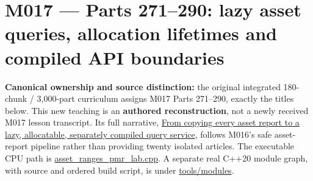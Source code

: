 \section{M017 --- Parts 271--290: lazy asset queries, allocation lifetimes and compiled API boundaries}\label{appendix-fd090d982a15-m017-parts-271290-lazy-asset-queries-allocation-lifetimes-and-compiled-api-boundaries}

\textbf{Canonical ownership and source distinction:} the original integrated 180-chunk / 3,000-part curriculum assigns M017 Parts 271--290, exactly the titles below. This new teaching is an \textbf{authored reconstruction}, not a newly received M017 lesson transcript. Its full narrative, \href{Continuous\%20Notes/Computing\%20Foundations\%20-\%20From\%20Bits\%20to\%20C++\%20and\%20Systems\%20APIs\#From\%20copying\%20every\%20asset\%20report\%20to\%20a\%20lazy,\%20allocatable,\%20separately\%20compiled\%20query\%20service}{From copying every asset report to a lazy, allocatable, separately compiled query service}, follows M016's safe asset-report pipeline rather than providing twenty isolated articles. The executable CPU path is \href{tools/labs/asset_ranges_pmr_lab.cpp}{asset\_ranges\_pmr\_lab.cpp}. A separate real C++20 module graph, with source and ordered build script, is under \href{tools/modules/build_module_lab.sh}{tools/modules}.

